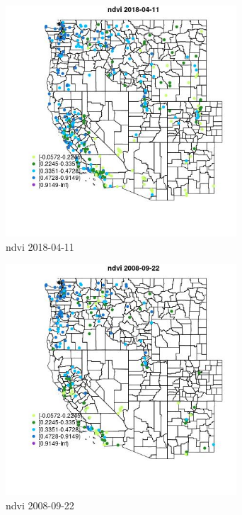 \begin{figure} 
\centering  
\includegraphics[width=0.77\textwidth]{Code_Outputs/Report_ML_input_PM25_Step4_part_e_de_duplicated_aves_compiled_2019-05-18wNAs_MapObsndvi2018-04-11.jpg} 
\caption{\label{fig:Report_ML_input_PM25_Step4_part_e_de_duplicated_aves_compiled_2019-05-18wNAsMapObsndvi2018-04-11}ndvi 2018-04-11} 
\end{figure} 
 

\begin{figure} 
\centering  
\includegraphics[width=0.77\textwidth]{Code_Outputs/Report_ML_input_PM25_Step4_part_e_de_duplicated_aves_compiled_2019-05-18wNAs_MapObsndvi2008-09-22.jpg} 
\caption{\label{fig:Report_ML_input_PM25_Step4_part_e_de_duplicated_aves_compiled_2019-05-18wNAsMapObsndvi2008-09-22}ndvi 2008-09-22} 
\end{figure} 
 
